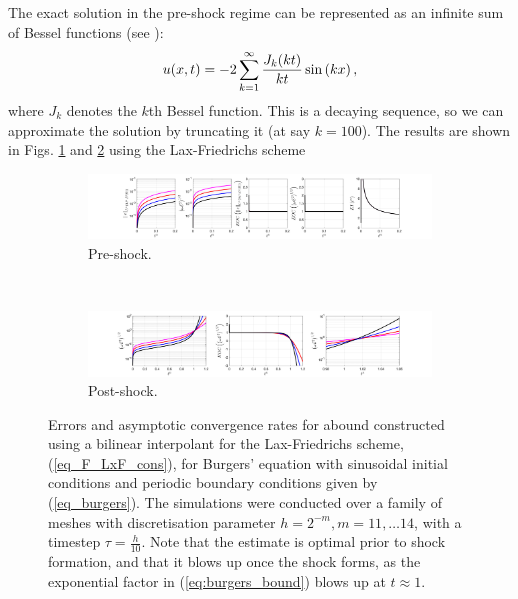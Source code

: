 \documentclass[final]{amsart}
\numberwithin{equation}{section}
\begin{document}
The exact solution in the pre-shock regime can be represented as an
infinite sum of Bessel functions (see
\cite{giesselmann2015posteriori}):
\begin{equation}
u\!\left({x,t}\right)=-2\sum_{k=1}^{\infty}\frac{J_k\!\left({kt}\right)}{kt}\operatorname{sin}\left(kx\right),
\end{equation}
where $J_k$ denotes the $k$th Bessel function.  This is a decaying
sequence, so we can approximate the solution by truncating it (at say
$k=100$).  The results are shown in
Figs. \ref{fig:Burgers_LxF_preshock} and
\ref{fig:Burgers_LxF_postshock} using the Lax-Friedrichs scheme
\begin{figure}[H]
	\begin{subfigure}[b]{\textwidth}
		\includegraphics[width=\textwidth]{../figures/fig_LxF_preshockplots_1x5_sin_IC_P3_burgers}	
		\caption{
			\label{fig:Burgers_LxF_preshock}
		Pre-shock.
		}
	\end{subfigure}
	\\
	\begin{subfigure}[b]{\textwidth}
		\includegraphics[width=\textwidth]{../figures/fig_LxF_postshockplots_1x5_sin_IC_P3_burgers}	
		\caption{\label{fig:Burgers_LxF_postshock}
		Post-shock.
		}
	\end{subfigure}
	\caption{\label{fig:LxF} Errors and asymptotic
		convergence rates for abound constructed using a bilinear interpolant for the Lax-Friedrichs scheme,
		(\ref{eq_F_LxF_cons}), for Burgers' equation with sinusoidal initial conditions and periodic boundary conditions given by (\ref{eq_burgers}).  The simulations were
		conducted over a family of meshes with discretisation parameter $h
		= 2^{-m}, m = 11,\dots 14$, with a timestep $\tau =
		\tfrac{h}{10}$. Note that the estimate is optimal prior to shock formation, and that it blows up once the shock forms,  as the exponential factor in (\ref{eq:burgers_bound}) blows up at $t\approx1$. }
\end{figure}
\end{document}
